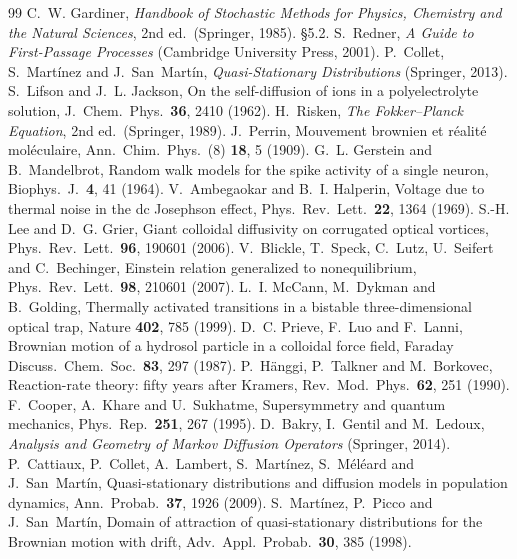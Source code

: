 \documentclass[11pt]{article}
\numberwithin{equation}{section}
\begin{document}
\begin{thebibliography}{99}
 C.~W. Gardiner, \emph{Handbook of Stochastic Methods for Physics, Chemistry and the
  Natural Sciences}, 2nd ed.\ (Springer, 1985). \S5.2.
 S.~Redner, \emph{A Guide to First-Passage Processes} (Cambridge University Press, 2001).
 P.~Collet, S.~Mart\'inez and J.~San~Mart\'in, \emph{Quasi-Stationary Distributions}
  (Springer, 2013).
 S.~Lifson and J.~L. Jackson, On the self-diffusion of ions in a polyelectrolyte solution,
  J.~Chem.\ Phys.\ \textbf{36}, 2410 (1962).
 H.~Risken, \emph{The Fokker--Planck Equation}, 2nd ed.\ (Springer, 1989).
 J.~Perrin, Mouvement brownien et r\'ealit\'e mol\'eculaire, Ann.\ Chim.\ Phys.\ (8)
  \textbf{18}, 5 (1909).
 G.~L. Gerstein and B.~Mandelbrot, Random walk models for the spike activity of a single
  neuron, Biophys.\ J.\ \textbf{4}, 41 (1964).
 V.~Ambegaokar and B.~I. Halperin, Voltage due to thermal noise in the dc Josephson effect,
  Phys.\ Rev.\ Lett.\ \textbf{22}, 1364 (1969).
 S.-H. Lee and D.~G. Grier, Giant colloidal diffusivity on corrugated optical vortices,
  Phys.\ Rev.\ Lett.\ \textbf{96}, 190601 (2006).
 V.~Blickle, T.~Speck, C.~Lutz, U.~Seifert and C.~Bechinger, Einstein relation generalized to
  nonequilibrium, Phys.\ Rev.\ Lett.\ \textbf{98}, 210601 (2007).
 L.~I. McCann, M.~Dykman and B.~Golding, Thermally activated transitions in a bistable
  three-dimensional optical trap, Nature \textbf{402}, 785 (1999).
 D.~C. Prieve, F.~Luo and F.~Lanni, Brownian motion of a hydrosol particle in a colloidal force
  field, Faraday Discuss.\ Chem.\ Soc.\ \textbf{83}, 297 (1987).
 P.~H\"anggi, P.~Talkner and M.~Borkovec, Reaction-rate theory: fifty years after Kramers,
  Rev.\ Mod.\ Phys.\ \textbf{62}, 251 (1990).
 F.~Cooper, A.~Khare and U.~Sukhatme, Supersymmetry and quantum mechanics, Phys.\ Rep.\
  \textbf{251}, 267 (1995).
 D.~Bakry, I.~Gentil and M.~Ledoux, \emph{Analysis and Geometry of Markov Diffusion Operators}
  (Springer, 2014).
 P.~Cattiaux, P.~Collet, A.~Lambert, S.~Mart\'inez, S.~M\'el\'eard and J.~San~Mart\'in,
  Quasi-stationary distributions and diffusion models in population dynamics, Ann.\ Probab.\ \textbf{37},
  1926 (2009).
 S.~Mart\'inez, P.~Picco and J.~San~Mart\'in, Domain of attraction of quasi-stationary
  distributions for the Brownian motion with drift, Adv.\ Appl.\ Probab.\ \textbf{30}, 385 (1998).

\end{thebibliography}
\end{document}
